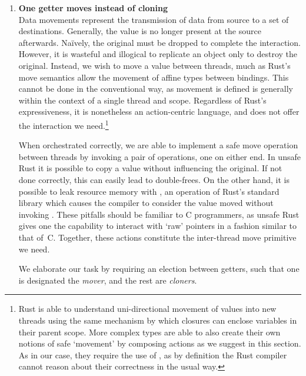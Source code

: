 \begin{enumerate}
	\item \textbf{One getter moves instead of cloning}\\
	Data movements represent the transmission of data from source to a set of destinations. Generally, the value is no longer present at the source afterwards. Na\"ively, the original must be dropped to complete the interaction. However, it is wasteful and illogical to replicate an object only to destroy the original. Instead, we wish to move a value between threads, much as Rust's move semantics allow the movement of affine types between bindings. This cannot be done in the conventional way, as movement is defined is generally within the context of a single thread and scope. Regardless of Rust's expressiveness, it is nonetheless an action-centric language, and does not offer the interaction we need.\footnote{Rust is able to understand uni-directional movement of values into new threads using the same mechanism by which closures can enclose variables in their parent scope. More complex types are able to also create their own notions of safe `movement' by composing actions as we suggest in this section. As in our case, they require the use of , as by definition the Rust compiler cannot reason about their correctness in the usual way.}
	
	When orchestrated correctly, we are able to implement a safe move operation between threads by invoking a pair of  operations, one on either end. In unsafe Rust it is possible to copy a value without influencing the original. If not done correctly, this can easily lead to double-frees. On the other hand, it is possible to leak resource memory with , an operation of Rust's standard library which causes the compiler to consider the value moved without invoking . These pitfalls should be familiar to C programmers, as unsafe Rust gives one the capability to interact with `raw' pointers in a fashion similar to that of~C. Together, these actions constitute the inter-thread move primitive we need.
	
	We elaborate our task by requiring an election between getters, such that one is designated the \textit{mover}, and the rest are \textit{cloners}. 
	

\end{enumerate}
